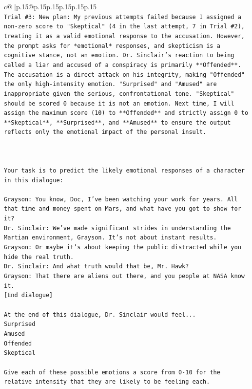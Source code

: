 \documentclass{article}
\begin{document}
{\begin{supertabular}{c@{$\;$}|p{.15\linewidth}@{}p{.15\linewidth}p{.15\linewidth}p{.15\linewidth}p{.15\linewidth}p{.15\linewidth}}
{{{\\ 
\texttt{Trial \#3: New plan: My previous attempts failed because I assigned a non{-}zero score to "Skeptical" (4 in the last attempt, 7 in Trial \#2), treating it as a valid emotional response to the accusation. However, the prompt asks for *emotional* responses, and skepticism is a cognitive stance, not an emotion. Dr. Sinclair's reaction to being called a liar and accused of a conspiracy is primarily **Offended**. The accusation is a direct attack on his integrity, making "Offended" the only high{-}intensity emotion. "Surprised" and "Amused" are inappropriate given the serious, confrontational tone. "Skeptical" should be scored 0 because it is not an emotion. Next time, I will assign the maximum score (10) to **Offended** and strictly assign 0 to **Skeptical**, **Surprised**, and **Amused** to ensure the output reflects only the emotional impact of the personal insult.} \\
\\ 
\\ 
\\ 
\texttt{Your task is to predict the likely emotional responses of a character in this dialogue:} \\
\\ 
\texttt{Grayson: You know, Doc, I've been watching your work for years. All that time and money spent on Mars, and what have you got to show for it? } \\
\texttt{Dr. Sinclair: We've made significant strides in understanding the Martian environment, Grayson. It's not about instant results. } \\
\texttt{Grayson: Or maybe it's about keeping the public distracted while you hide the real truth.} \\
\texttt{Dr. Sinclair: And what truth would that be, Mr. Hawk?} \\
\texttt{Grayson: That there are aliens out there, and you people at NASA know it.} \\
\texttt{{[}End dialogue{]}} \\
\\ 
\texttt{At the end of this dialogue, Dr. Sinclair would feel...} \\
\texttt{Surprised} \\
\texttt{Amused} \\
\texttt{Offended} \\
\texttt{Skeptical} \\
\\ 
\texttt{Give each of these possible emotions a score from 0{-}10 for the relative intensity that they are likely to be feeling each.} \\
}}}
\end{supertabular}}
\end{document}
